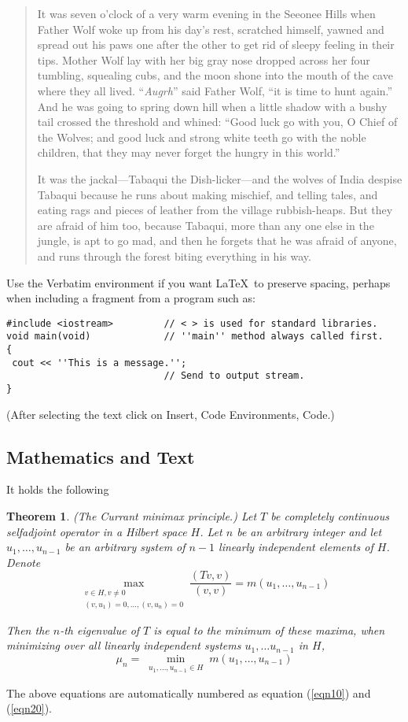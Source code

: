 \documentclass[11pt,a4paper]{amsart}
\newtheorem{theorem}{Theorem}
\theoremstyle{plain}
\numberwithin{equation}{section}
\theoremstyle{definition}
\begin{document}
\begin{quotation}
It was seven o'clock of a very warm evening in the Seeonee Hills when Father Wolf woke
up from his day's rest, scratched himself, yawned  and spread out his paws one after
the other to get rid of sleepy feeling in their tips. Mother Wolf lay with her big gray
nose dropped across her four tumbling, squealing cubs, and the moon shone into the
mouth of the cave where they all lived. ``\emph{Augrh}'' said Father Wolf, ``it is time
to hunt again.'' And he was going to spring down hill when a little shadow with a bushy
tail crossed the threshold and whined: ``Good luck go with you, O Chief of the Wolves;
and good luck and strong white teeth go with the noble children, that they may never
forget the hungry in this world.''

It was the jackal---Tabaqui the Dish-licker---and the wolves of India despise Tabaqui
because he runs about making mischief, and telling tales, and eating rags and pieces of
leather from the village rubbish-heaps. But they are afraid of him too, because
Tabaqui, more than any one else in the jungle, is apt to go mad, and then he forgets
that he was afraid of anyone, and runs through the forest biting everything in his way.
\end{quotation}

Use the Verbatim environment if you want \LaTeX\ to preserve spacing, perhaps when
including a fragment from a program such as:
\begin{verbatim}
#include <iostream>         // < > is used for standard libraries.
void main(void)             // ''main'' method always called first.
{
 cout << ''This is a message.'';
                            // Send to output stream.
}
\end{verbatim}
(After selecting the text click on Insert, Code Environments, Code.)


\subsection{Mathematics and Text}

It holds \cite{KarelRektorys} the following
\begin{theorem}
(The Currant minimax principle.) Let $T$ be completely continuous selfadjoint operator
in a Hilbert space $H$. Let $n$ be an arbitrary integer and let $u_1,\ldots,u_{n-1}$ be
an arbitrary system of $n-1$ linearly independent elements of $H$. Denote
\begin{equation}
\max_{\substack{v\in H, v\neq0\\
(v,u_1)=0,\ldots,(v,u_n)=0}}
\frac{(Tv,v)}{(v,v)}=m(u_1,\ldots, u_{n-1}) \label{eqn10}
\end{equation}


Then the $n$-th eigenvalue of $T$ is equal to the minimum of these maxima, when minimizing over all linearly independent systems $u_1,\ldots u_{n-1}$ in $H$,
\begin{equation}
\mu_n = \min_{\substack{u_1,\ldots, u_{n-1}\in H}} m(u_1,\ldots, u_{n-1}) \label{eqn20}
\end{equation}
\end{theorem}
The above equations are automatically numbered as equation (\ref{eqn10}) and
(\ref{eqn20}).
\end{document}
